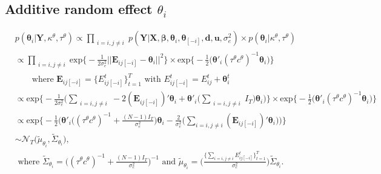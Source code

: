 \documentclass[a4paper]{article}
\begin{document}
\subsection{Additive random effect $\theta_i$} \label{theta}		
		\begin{equation}
		\begin{aligned}
		&p(\boldsymbol{\theta}_{i}|\mathbf{Y}, \kappa^\theta, \tau^\theta) \propto \prod\limits_{\substack{i=i, j\neq i}}p(\mathbf{Y}|\mathbf{X},\boldsymbol{\beta}, \boldsymbol{\theta}_{i}, \boldsymbol{\theta}_{[-i]}, \boldsymbol{d}, \boldsymbol{u},\sigma_e^2) \times p(\boldsymbol{\theta}_{i}|\kappa^\theta, \tau^\theta) \\
		&\propto\prod\limits_{\substack{i=i, j\neq i}}\mbox{exp}\Big\{-\frac{1}{2\sigma_e^2}||\mathbf{E}_{ij[-i]}-\boldsymbol{\theta}_{i}||^2\Big\}\times \mbox{exp}\Big\{-\frac{1}{2}\big(\boldsymbol{\theta}'_{i}{(\tau^\theta c^\theta)}^{-1}\boldsymbol{\theta}_{i}\big)\Big\}\\
		& \quad\quad\mbox{where } \mathbf{E}_{ij[-i]}=\{E^t_{ij[-i]}\}_{t=1}^T \mbox{ with } E^t_{ij[-i]}=E^t_{ij}+\boldsymbol{\theta}^t_{i}\\
		&\propto\mbox{exp}\Big\{-\frac{1}{2\sigma_e^2}\Big(\sum\limits_{\substack{i=i, j\neq i}}-2(\mathbf{E}_{ij[-i]})'\boldsymbol{\theta}_{i}+\boldsymbol{\theta}'_{i}\big(\sum\limits_{\substack{i=i, j\neq i}}I_T\big)\boldsymbol{\theta}_{i}\Big)\Big\}\times \mbox{exp}\Big\{-\frac{1}{2}\big(\boldsymbol{\theta}'_{i}{(\tau^\theta c^\theta)}^{-1}\boldsymbol{\theta}_{i}\big)\Big\}\\
		&\propto\mbox{exp}\Big\{-\frac{1}{2}\Big(\boldsymbol{\theta}'_{i}\big({(\tau^\theta c^\theta)}^{-1}+\frac{(N-1)I_T}{\sigma_e^2}\big)\boldsymbol{\theta}_{i}-\frac{2}{\sigma_e^2}\big(\sum_{i=i, j\neq i}(\mathbf{E}_{ij[-i]})'\boldsymbol{\theta}_{i}\big)\Big)\Big\}\\
		& \sim \mathcal{N}_T\big(\tilde{\mu}_{\theta_i}, \tilde{\Sigma}_{\theta_i} \big),\\
		& \mbox{ where } \tilde{\Sigma}_{\theta_i} = \Big((\tau^\theta c^\theta)^{-1}+\frac{(N-1)I_T}{\sigma_e^2}\Big)^{-1} \mbox{ and }
		\tilde{\mu}_{\theta_i} = \Big(\frac{\{\sum_{i=i, j\neq i}E^{t}_{ij[-i]}\}_{t=1}^{T}}{\sigma_e^2}\Big)\tilde{\Sigma}_{\theta_i}.
		\end{aligned}
		\end{equation} 
\end{document}

